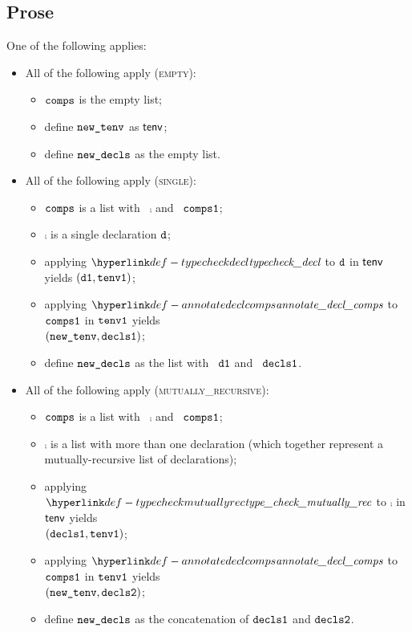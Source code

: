 \subsection{Prose}
One of the following applies:
\begin{itemize}
  \item All of the following apply (\textsc{empty}):
  \begin{itemize}
    \item $\texttt{comps}$ is the empty list;
    \item define $\texttt{new\_tenv}$ as $\textsf{tenv}$;
    \item define $\texttt{new\_decls}$ as the empty list.
  \end{itemize}

  \item All of the following apply (\textsc{single}):
  \begin{itemize}
    \item $\texttt{comps}$ is a list with \head\ $\comp$ and \tail\ $\texttt{comps1}$;
    \item $\comp$ is a single declaration $\texttt{d}$;
    \item applying $\typecheckdecl$ to $\texttt{d}$ in $\textsf{tenv}$ yields $(\texttt{d1}, \texttt{tenv1})$\ProseOrTypeError;
    \item applying $\annotatedeclcomps$ to $\texttt{comps1}$ in $\texttt{tenv1}$ yields \\ $(\texttt{new\_tenv}, \texttt{decls1})$\ProseOrTypeError;
    \item define $\texttt{new\_decls}$ as the list with \head\ $\texttt{d1}$ and \tail\ $\texttt{decls1}$.
  \end{itemize}

  \item All of the following apply (\textsc{mutually\_recursive}):
  \begin{itemize}
    \item $\texttt{comps}$ is a list with \head\ $\comp$ and \tail\ $\texttt{comps1}$;
    \item $\comp$ is a list with more than one declaration (which together represent a mutually-recursive
          list of declarations);
    \item applying $\typecheckmutuallyrec$ to $\comp$ in $\textsf{tenv}$ yields \\ $(\texttt{decls1}, \texttt{tenv1})$\ProseOrTypeError;
    \item applying $\annotatedeclcomps$ to $\texttt{comps1}$ in $\texttt{tenv1}$ yields \\ $(\texttt{new\_tenv}, \texttt{decls2})$\ProseOrTypeError;
    \item define $\texttt{new\_decls}$ as the concatenation of $\texttt{decls1}$ and $\texttt{decls2}$.
  \end{itemize}
\end{itemize}

